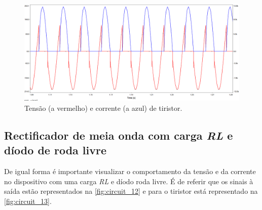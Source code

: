 \documentclass[a4paper,11pt]{article}
\numberwithin{equation}{section}
\begin{document}
\begin{figure}[h]
	\centering
	\includegraphics[keepaspectratio=true, scale=0.35]{img/circuito9}
	\caption{Tensão (a vermelho) e corrente (a azul) de tiristor.}
	\label{fig:circuit_11}
	\vspace{-0.8em}
\end{figure}

\subsection{Rectificador de meia onda com carga \textit{RL} e díodo de roda livre}
De igual forma é importante visualizar o comportamento da tensão e da corrente no dispositivo com uma carga \textit{RL} e díodo roda livre. É de referir que os sinais à saída estão representados na \autoref{fig:circuit_12} e para o tiristor está representado na \autoref{fig:circuit_13}.
\end{document}

